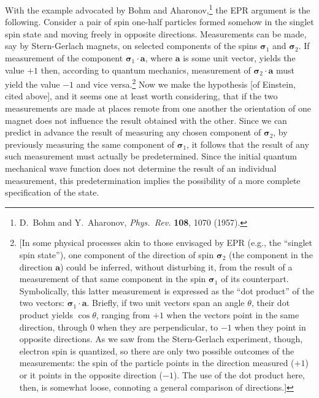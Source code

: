 With the example advocated by Bohm and Aharonov,\footnote{D.\ Bohm and Y.\ Aharonov, \emph{Phys.\ Rev.} \textbf{108}, 1070 (1957).} the EPR argument is the following. Consider
a pair of spin one-half particles formed somehow in the singlet spin state and moving freely in opposite
directions. Measurements can be made, say by Stern-Gerlach magnets, on selected components of the
spins $\pmb{\sigma}_1$ and $\pmb{\sigma}_2$. If measurement of the component $\pmb{\sigma}_1 \cdot \pmb{a}$, where $\pmb{a}$ is some unit vector, yields the value $+1$ then, according to quantum mechanics, measurement of $\pmb{\sigma}_2 \cdot \pmb{a}$ must yield the value $-1$ and vice versa.\footnote{[In some physical processes akin to those envisaged by EPR (e.g., the ``singlet spin state''), one component of the direction of spin $\pmb{\sigma}_2$ (the component in the direction $\pmb{a}$) could be inferred, without disturbing it, from the result of a measurement of that same component in the spin $\pmb{\sigma}_1$ of its counterpart. Symbolically, this latter measurement is expressed as the ``dot product'' of the two vectors: $\pmb{\sigma}_1 \cdot \pmb{a}$. Briefly, if two unit vectors span an angle $\theta$, their dot product yields $\cos \theta$, ranging from $+1$ when the vectors point in the same direction, through $0$ when they are perpendicular, to $-1$ when they point in opposite directions. As we saw from the Stern-Gerlach experiment, though, electron spin is quantized, so there are only two possible outcomes of the measurements: the spin of the particle points in the direction measured ($+1$) or it points in the opposite direction ($-1$). The use of the dot product here, then, is somewhat loose, connoting a general comparison of directions.]}
Now we make the hypothesis [of Einstein, cited above], and it seems one at least worth considering, that if the two measurements
are made at places remote from one another the orientation of one magnet does not influence the
result obtained with the other. Since we can predict in advance the result of measuring any chosen component
of $\pmb{\sigma}_2$, by previously measuring the same component of $\pmb{\sigma}_1$, it follows that the result of any such
measurement must actually be predetermined. Since the initial quantum mechanical wave function does not
determine the result of an individual measurement, this predetermination implies the possibility of a more
complete specification of the state.

